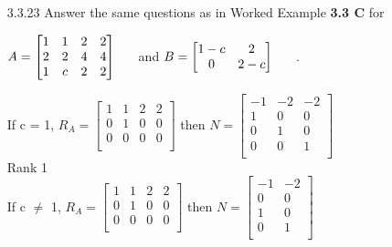 \documentclass[10pt,twoside,reqno]{article}
\begin{document}
\begin{enumerate}
\vspace{3mm}
\item[3.3.23] Answer the same questions as in Worked Example \textbf{3.3 C} for \\
\begin{center}
$
$$
A =
\begin{bmatrix}
1&1&2&2\\
2&2&4&4\\
1&c&2&2\\
\end{bmatrix}
\hspace{5mm}
$$
$
and
\hspace{5mm}
$
$$
B = 
\begin{bmatrix}
1-c&2\\
0&2-c\\
\end{bmatrix}
\hspace{5mm}
$$
$
. \\
\end{center}
\vspace{3mm}
\begin{center}
If c = 1,
$
$$
R_A =
\begin{bmatrix}
1&1&2&2\\
0&1&0&0\\
0&0&0&0\\
\end{bmatrix}
$$
$
then
$
$$
N =
\begin{bmatrix}
-1&-2&-2\\
1&0&0\\
0&1&0\\
0&0&1\\
\end{bmatrix}
$$
$\\
Rank 1\\
If c $\neq$ 1,
$
$$
R_A =
\begin{bmatrix}
1&1&2&2\\
0&1&0&0\\
0&0&0&0\\
\end{bmatrix}
$$
$
then
$
$$
N =
\begin{bmatrix}
-1&-2\\
0&0\\
1&0\\
0&1\\
\end{bmatrix}
$$
$\\

\end{center}
\end{enumerate}
\end{document}
